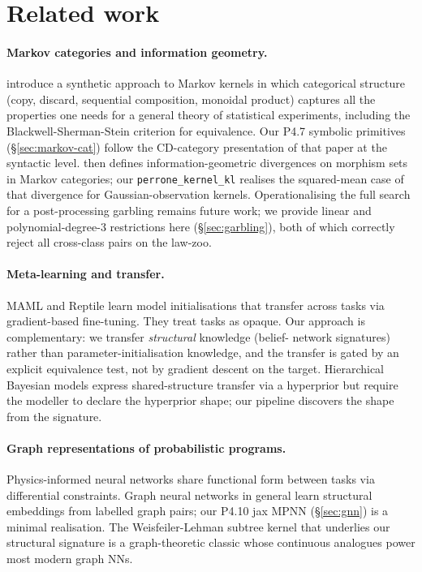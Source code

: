 \documentclass{article}
\begin{document}
\section{Related work}
\label{sec:related}

\paragraph{Markov categories and information geometry.}
\citet{fritz2020synthetic} introduce a synthetic approach to Markov
kernels in which categorical structure (copy, discard, sequential
composition, monoidal product) captures all the properties one needs
for a general theory of statistical experiments, including the
Blackwell-Sherman-Stein criterion for equivalence. Our P4.7 symbolic
primitives (\S\ref{sec:markov-cat}) follow the CD-category
presentation of that paper at the syntactic level.
\citet{perrone2024catinfogeom} then defines information-geometric
divergences on morphism sets in Markov categories; our
\texttt{perrone\_kernel\_kl} realises the squared-mean case of that
divergence for Gaussian-observation kernels. Operationalising the full
search for a post-processing garbling remains future work; we provide
linear and polynomial-degree-$3$ restrictions here
(\S\ref{sec:garbling}), both of which correctly reject all cross-class
pairs on the law-zoo.

\paragraph{Meta-learning and transfer.}
MAML \citep{finn2017maml} and Reptile \citep{nichol2018reptile} learn
model initialisations that transfer across tasks via
gradient-based fine-tuning. They treat tasks as opaque. Our approach
is complementary: we transfer \emph{structural} knowledge (belief-
network signatures) rather than parameter-initialisation knowledge,
and the transfer is gated by an explicit equivalence test, not by
gradient descent on the target. Hierarchical Bayesian models
\citep{gelman2013bda} express shared-structure transfer via a
hyperprior but require the modeller to declare the hyperprior shape;
our pipeline discovers the shape from the signature.

\paragraph{Graph representations of probabilistic programs.}
Physics-informed neural networks \citep{raissi2019pinn} share
functional form between tasks via differential constraints. Graph
neural networks in general
\citep{scarselli2008gnn, kipf2017gcn, xu2019gin} learn structural
embeddings from labelled graph pairs; our P4.10 jax MPNN
(\S\ref{sec:gnn}) is a minimal realisation. The Weisfeiler-Lehman
subtree kernel \citep{shervashidze2011wl} that underlies our
structural signature is a graph-theoretic classic whose continuous
analogues power most modern graph NNs.
\end{document}
